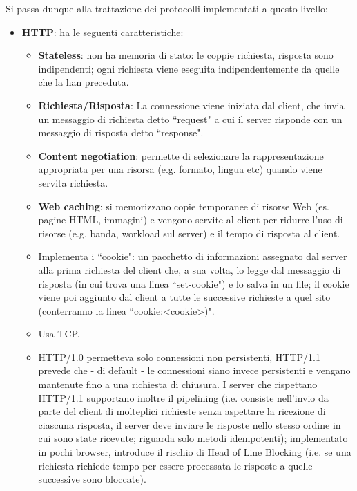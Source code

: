 \documentclass[11pt, italian, openany]{book}
\begin{document}
\begin{sloppypar}
Si passa dunque alla trattazione dei protocolli implementati a questo livello:
\begin{itemize}[topsep=0pt, itemsep=0pt, parsep=0pt]
	\item \textbf{HTTP}: ha le seguenti caratteristiche:
	\begin{itemize}[topsep=0pt, itemsep=0pt, parsep=0pt]
		\item \textbf{Stateless}: non ha memoria di stato: le coppie richiesta, risposta sono indipendenti; ogni richiesta viene eseguita indipendentemente
		da quelle che la han preceduta.
		\item \textbf{Richiesta/Risposta}: La connessione viene iniziata dal client, che invia un messaggio di richiesta detto ``request" a cui il server
		risponde con un messaggio di risposta detto ``response".
		\item \textbf{Content negotiation}: permette di selezionare la rappresentazione appropriata per una risorsa (e.g. formato, lingua etc) quando
		viene servita richiesta.
		\item \textbf{Web caching}: si memorizzano copie temporanee di risorse Web (es. pagine HTML, immagini) e vengono servite al client per ridurre
		l’uso di risorse (e.g. banda, workload sul server) e il tempo di risposta al client.
		\item Implementa i ``cookie": un pacchetto di informazioni assegnato dal server alla prima richiesta del client che, a sua volta, lo legge dal
		messaggio di risposta (in cui trova una linea ``set-cookie") e lo salva in un file; il cookie viene poi aggiunto dal client a tutte le successive
		richieste a quel sito (conterranno la linea ``cookie:\textless{cookie}\textgreater{)}".
		\item Usa TCP.
		\item HTTP/1.0 permetteva solo connessioni non persistenti, HTTP/1.1 prevede che - di default - le connessioni siano invece persistenti e vengano
		mantenute fino a una richiesta di chiusura. I server che rispettano HTTP/1.1 supportano inoltre il pipelining (i.e. consiste nell’invio da parte del
		client di molteplici richieste senza aspettare la ricezione di ciascuna risposta, il server deve inviare le risposte nello stesso ordine in cui
		sono state ricevute; riguarda solo metodi idempotenti); implementato in pochi browser, introduce il rischio di Head of Line Blocking (i.e. se una
		richiesta richiede tempo per essere processata le risposte a quelle successive sono bloccate).
	\end{itemize}


\end{itemize}
\end{sloppypar}
\end{document}
